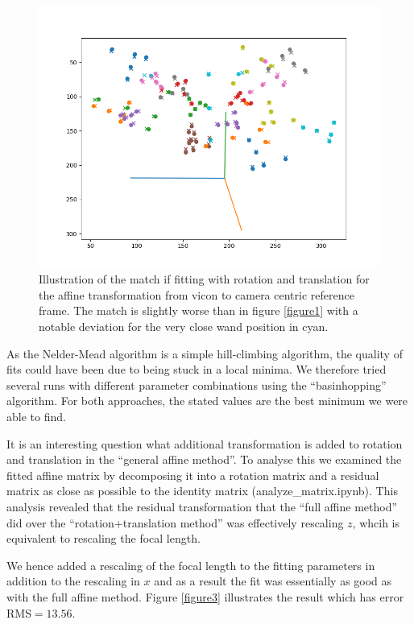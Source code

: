 \documentclass{article}
\begin{document}
\begin{figure}
  \includegraphics[width=\textwidth]{figure_match_euler.png}
  \caption{\label{figure2} Illustration of the match if fitting with rotation and translation for the affine transformation from vicon to camera centric reference frame. The match is slightly worse than in figure \ref{figure1} with a notable deviation for the very close wand position in cyan.} 
\end{figure}

As the Nelder-Mead algorithm is a simple hill-climbing algorithm, the quality of fits could have been due to being stuck in a local minima. We therefore tried several runs with different parameter combinations using the ``basinhopping'' algorithm. For both approaches, the stated values are the best minimum we were able to find.

It is an interesting question what additional transformation is added to rotation and translation in the ``general affine method''. To analyse this we examined the fitted affine matrix by decomposing it into a rotation matrix and a residual matrix as close as possible to the identity matrix (analyze\_matrix.ipynb). This analysis revealed that the residual transformation that the ``full affine method'' did over the ``rotation+translation method'' was effectively rescaling $z$, whcih is equivalent to rescaling the focal length.

We hence added a rescaling of the focal length to the fitting parameters in addition to the rescaling in $x$ and as a result the fit was essentially as good as with the full affine method.
Figure \ref{figure3} illustrates the result which has error RMS$= 13.56$.
\end{document}
